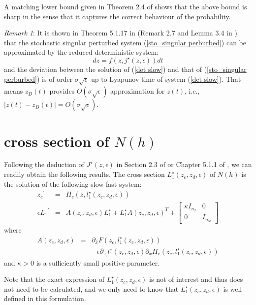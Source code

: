 \documentclass[journal]{IEEEtran}
\newcommand{\ee}{\epsilon}
\begin{document}
A matching lower bound given in Theorem 2.4 of \cite{Gentz:2003} shows that the above bound is sharp in the sense that it captures the correct behaviour of the probability.


\textit{Remark 1}: It is shown in Theorem 5.1.17 in \cite{Gentz:2006} (Remark 2.7 and Lemma 3.4 in \cite{Gentz:2003}) that the stochastic singular perturbed system (\ref{sto_singular perburbed}) can be approximated by the reduced deterministic system:
\begin{equation}\label{det slow}
dz=f(z,j^\star(z,\ee))dt
\end{equation}
and the deviation between the solution of (\ref{det slow}) and that of (\ref{sto_singular perburbed}) is of order $\sigma\sqrt{\ee}$ up to Lyapunov time of system (\ref{det slow}). That means $z_D(t)$ provides $O(\sigma\sqrt{\ee})$ approximation for $z(t)$, i.e., $|z(t)-z_D(t)|=O(\sigma\sqrt{\ee})$.



\section{cross section of $N(h)$}\label{appendix2}
Following the deduction of $J^\star(z,\ee)$ in Section 2.3 of \cite{Gentz:2003} or Chapter 5.1.1 of \cite{Gentz:2006}, we can readily obtain the following results. The cross section $L_1^\star(z_c,z_d,\ee)$ of $N(h)$ is the solution of the following slow-fast system:
\begin{eqnarray}\label{transformedpower}
{z_c}^\prime&=&H_c(z,l_1^\star(z_c,z_d,\ee))\label{n(h)}\\
\ee{L_1}^\prime&=&A(z_c,z_d,\ee)L_1^\star+L_1^\star A(z_c,z_d,\ee)^T+\left[\begin{array}{cc} \kappa I_{n_{{x}}}&0\\0& I_{n_w}\end{array}\right]\nonumber
\end{eqnarray}
where
\begin{eqnarray}
A(z_c,z_d,\ee)&=&\partial_{\bar{x}} F(z_c,{l_1^\star}(z_c,z_d,\ee))\\
&&-\ee \partial_{z_c}{l_1^\star}(z_c,z_d,\ee)\partial_{\bar{x}} H_c(z_c,l_1^\star(z_c,z_d,\ee))\nonumber
\end{eqnarray}
and $\kappa>0$ is a sufficiently small positive parameter.


Note that the exact expression of $L_1^\star(z_c,z_d,\ee)$ is not of interest and thus does not need to be calculated, and we only need to know that $L_1^\star(z_c,z_d,\ee)$ is well defined in this formulation.
\end{document}
